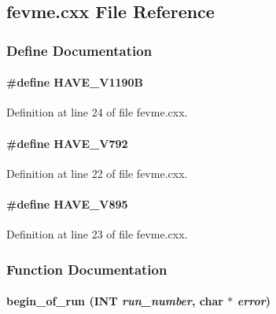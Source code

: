 \subsection{fevme.cxx File Reference}
\label{fevme_8cxx}


\subsubsection{Define Documentation}
\paragraph[{HAVE\_\-V1190B}]{\setlength{\rightskip}{0pt plus 5cm}\#define HAVE\_\-V1190B}\hfill\label{fevme_8cxx_ab45753b1bdc2608c0bb98ed25fe0764c}


Definition at line 24 of file fevme.cxx.
\paragraph[{HAVE\_\-V792}]{\setlength{\rightskip}{0pt plus 5cm}\#define HAVE\_\-V792}\hfill\label{fevme_8cxx_a04522b81613d2958ac83989f068d4654}


Definition at line 22 of file fevme.cxx.
\paragraph[{HAVE\_\-V895}]{\setlength{\rightskip}{0pt plus 5cm}\#define HAVE\_\-V895}\hfill\label{fevme_8cxx_ac4846e12d784d2e99e73949aa561142a}


Definition at line 23 of file fevme.cxx.

\subsubsection{Function Documentation}
\paragraph[{begin\_\-of\_\-run}]{ begin\_\-of\_\-run ({\bf INT} {\em run\_\-number}, \/  char $\ast$ {\em error})}\hfill\label{fevme_8cxx_ad8bfe703c49342b9f0275aba77dc7758}


